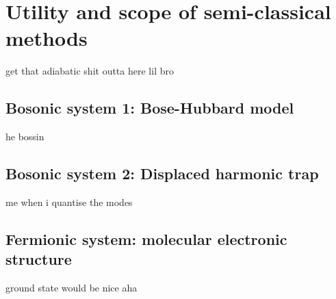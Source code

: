 \section{Utility and scope of semi-classical methods}
get that adiabatic shit outta here lil bro
	
\subsection{Bosonic system 1: Bose-Hubbard model}
he bossin
	
\subsection{Bosonic system 2: Displaced harmonic trap}
me when i quantise the modes
	
\subsection{Fermionic system: molecular electronic structure}
ground state would be nice aha
